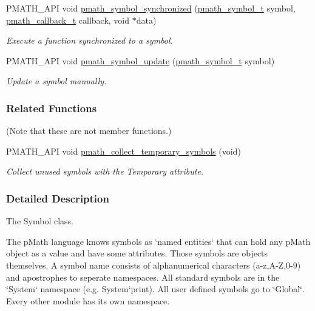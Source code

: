 \begin{CompactItemize}
PMATH\_\-API void \hyperlink{group__symbols_g95b141d9cb33fba80d6a807f304ee3b7}{pmath\_\-symbol\_\-synchronized} (\hyperlink{classpmath__symbol__t}{pmath\_\-symbol\_\-t} symbol, \hyperlink{group__general__types_ge1a454657f18f3cc54508adeccccbcbc}{pmath\_\-callback\_\-t} callback, void $\ast$data)
\begin{CompactList}\small\item\em Execute a function synchronized to a symbol. \item\end{CompactList}\item 
PMATH\_\-API void \hyperlink{group__symbols_g7cd56e2b77ac13a11f1b6f7fd13ba357}{pmath\_\-symbol\_\-update} (\hyperlink{classpmath__symbol__t}{pmath\_\-symbol\_\-t} symbol)
\begin{CompactList}\small\item\em Update a symbol manually. \item\end{CompactList}\end{CompactItemize}
\subsubsection*{Related Functions}
(Note that these are not member functions.) \begin{CompactItemize}
\item 
PMATH\_\-API void \hyperlink{classpmath__symbol__t_8b277745c51f34c11ed78c10a2ecb44b}{pmath\_\-collect\_\-temporary\_\-symbols} (void)
\begin{CompactList}\small\item\em Collect unused symbols with the Temporary attribute. \item\end{CompactList}\end{CompactItemize}


\subsubsection{Detailed Description}
The Symbol class. 

The pMath language knows symbols as `named entities` that can hold any pMath object as a value and have some attributes. Those symbols are objects themselves. A symbol name consists of alphanumerical characters (a-z,A-Z,0-9) and apostrophes to seperate namespaces. All standard symbols are in the \char`\"{}System\char`\"{} namespace (e.g. System`print). All user defined symbols go to \char`\"{}Global\char`\"{}. Every other module has its own namespace.

